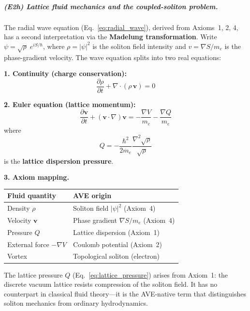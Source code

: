 \subparagraph{(E2h) Lattice fluid mechanics
and the coupled-soliton problem.}

The radial wave equation (Eq.~\ref{eq:radial_wave}),
derived from Axioms~1, 2, 4, has a second
interpretation via the \textbf{Madelung
transformation}.  Write $\psi = \sqrt{\rho}\;
e^{iS/\hbar}$, where $\rho = |\psi|^2$ is the
soliton field intensity and
$v = \nabla S / m_e$ is the phase-gradient
velocity.  The wave equation splits into two
real equations:

\noindent\textbf{1. Continuity (charge conservation):}
\begin{equation}
    \frac{\partial \rho}{\partial t}
    + \nabla \cdot (\rho\,\mathbf{v}) = 0
    \label{eq:madelung_continuity}
\end{equation}

\noindent\textbf{2. Euler equation (lattice momentum):}
\begin{equation}
    \frac{\partial \mathbf{v}}{\partial t}
    + (\mathbf{v} \cdot \nabla)\mathbf{v}
    = -\frac{\nabla V}{m_e}
    - \frac{\nabla Q}{m_e}
    \label{eq:madelung_euler}
\end{equation}
where
\begin{equation}
    Q = -\frac{\hbar^2}{2m_e}
    \frac{\nabla^2 \sqrt{\rho}}{\sqrt{\rho}}
    \label{eq:lattice_pressure}
\end{equation}
is the \textbf{lattice dispersion pressure}.

\noindent\textbf{3. Axiom mapping.}
\begin{center}
\small
\renewcommand{\arraystretch}{1.2}
\begin{tabular}{ll}
\hline
\textbf{Fluid quantity}
& \textbf{AVE origin} \\
\hline
Density $\rho$ & Soliton field $|\psi|^2$
    (Axiom~4) \\
Velocity $\mathbf{v}$
    & Phase gradient $\nabla S / m_e$
    (Axiom~4) \\
Pressure $Q$
    & Lattice dispersion (Axiom~1) \\
External force $-\nabla V$
    & Coulomb potential (Axiom~2) \\
Vortex
    & Topological soliton (electron) \\
\hline
\end{tabular}
\end{center}
The lattice pressure $Q$
(Eq.~\ref{eq:lattice_pressure}) arises from
Axiom~1: the discrete vacuum lattice resists
compression of the soliton field.  It has
no counterpart in classical fluid theory---it
is the AVE-native term that distinguishes
soliton mechanics from ordinary hydrodynamics.

